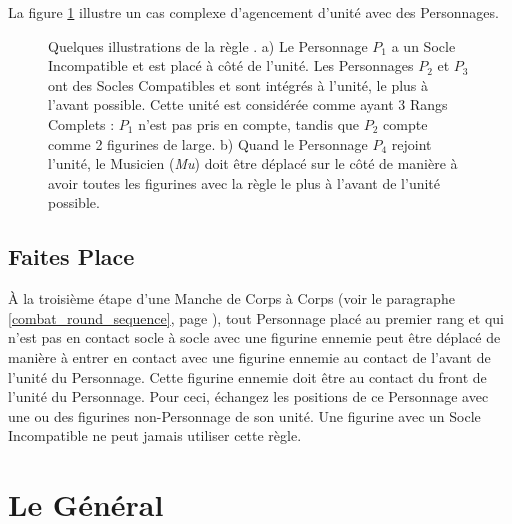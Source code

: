 La figure \ref{figure/front_rank} illustre un cas complexe d'agencement d'unité avec des Personnages.

\newcommand{\figFRA}{a)}
\newcommand{\figFRB}{b)}
\newcommand{\figFRCharOne}{$ P_{1} $}
\newcommand{\figFRCharTwo}{$ P_{2} $}
\newcommand{\figFRCharThree}{$ P_{3} $}
\newcommand{\figFRCharFour}{$ P_{4} $}
\newcommand{\figFRChamp}{\textit{Ch}}
\newcommand{\figFRStand}{\textit{Ét}}
\newcommand{\figFRMus}{\textit{Mu}}

\begin{figure}[!htbp]
\centering
\hypertarget{frontrankfigure}{
\def\svgwidth{0.8\textwidth}

\caption{Quelques illustrations de la règle \frontrank{}.\vspace*{10pt}\newline
a) Le Personnage $ P_{1} $ a un Socle Incompatible et est placé à côté de l'unité. Les Personnages $ P_{2} $ et $ P_{3} $ ont des Socles Compatibles et sont intégrés à l'unité, le plus à l'avant possible. Cette unité est considérée comme ayant 3 Rangs Complets : $ P_{1} $ n'est pas pris en compte, tandis que $ P_{2} $ compte comme 2 figurines de large.\vspace*{10pt}\newline
b) Quand le Personnage $ P_{4} $ rejoint l'unité, le Musicien (\textit{Mu}) doit être déplacé sur le côté de manière à avoir toutes les figurines avec la règle \frontrank{} le plus à l'avant de l'unité possible.}
\label{figure/front_rank}
}
\end{figure}

\newpage
\hypertarget{makeway}{\subsection{Faites Place}}
\label{make_way}

À la troisième étape d'une Manche de Corps à Corps (voir le paragraphe \ref{combat_round_sequence}, page \pageref{combat_round_sequence}), tout Personnage placé au premier rang et qui n'est pas en contact socle à socle avec une figurine ennemie peut être déplacé de manière à entrer en contact avec une figurine ennemie au contact de l'avant de l'unité du Personnage. Cette figurine ennemie doit être au contact du front de l'unité du Personnage. Pour ceci, échangez les positions de ce Personnage avec une ou des figurines non-Personnage de son unité. Une figurine avec un Socle Incompatible ne peut jamais utiliser cette règle.

\newpage
\hypertarget{thegeneral}{\section{Le Général}}
\label{thegeneral}

